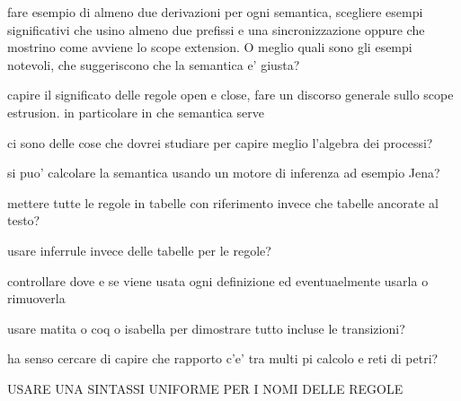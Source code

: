 
fare esempio di almeno due derivazioni per ogni semantica, scegliere esempi significativi che usino almeno due prefissi e una sincronizzazione oppure che mostrino come avviene lo scope extension.
O meglio quali sono gli esempi notevoli, che suggeriscono che la semantica e' giusta?

capire il significato delle regole open e close, fare un discorso generale sullo scope estrusion. in particolare in che semantica serve

ci sono delle cose che dovrei studiare per capire meglio l'algebra dei processi?

si puo' calcolare la semantica usando un motore di inferenza ad esempio Jena?

mettere tutte le regole in tabelle con riferimento invece che tabelle ancorate al testo?

usare inferrule invece delle tabelle per le regole?

controllare dove e se viene usata ogni definizione ed eventuaelmente usarla o rimuoverla

usare matita o coq o isabella per dimostrare tutto incluse le transizioni?

ha senso cercare di capire che rapporto c'e' tra multi pi calcolo e reti di petri?

USARE UNA SINTASSI UNIFORME PER I NOMI DELLE REGOLE